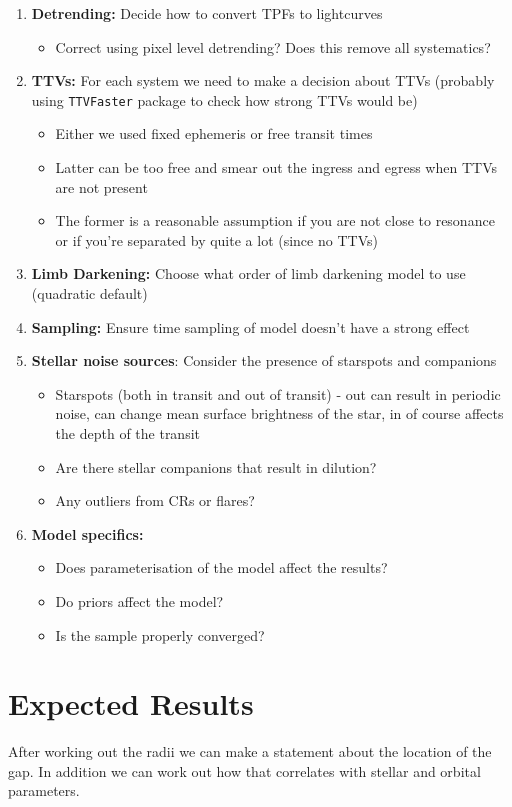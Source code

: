 \documentclass[12pt, letterpaper, twoside]{article}
\begin{document}
\begin{enumerate}
    \item \textbf{Detrending:} Decide how to convert TPFs to lightcurves
    \begin{itemize}
        \item Correct using pixel level detrending? Does this remove all systematics?
    \end{itemize}
    \item \textbf{TTVs:} For each system we need to make a decision about TTVs (probably using \texttt{TTVFaster} package to check how strong TTVs would be)
    \begin{itemize}
        \item Either we used fixed ephemeris or free transit times
        \item Latter can be too free and smear out the ingress and egress when TTVs are not present
        \item The former is a reasonable assumption if you are not close to resonance or if you're separated by quite a lot (since no TTVs)
    \end{itemize}
    \item \textbf{Limb Darkening:} Choose what order of limb darkening model to use (quadratic default)
    \item \textbf{Sampling:} Ensure time sampling of model doesn't have a strong effect
    \item \textbf{Stellar noise sources}: Consider the presence of starspots and companions
    \begin{itemize}
        \item Starspots (both in transit and out of transit) - out can result in periodic noise, can change mean surface brightness of the star, in of course affects the depth of the transit
        \item Are there stellar companions that result in dilution?
        \item Any outliers from CRs or flares?
    \end{itemize}
    \item \textbf{Model specifics:}
    \begin{itemize}
        \item Does parameterisation of the model affect the results?
        \item Do priors affect the model?
        \item Is the sample properly converged?
    \end{itemize}
\end{enumerate}

\section*{Expected Results}

After working out the radii we can make a statement about the location of the gap. In addition we can work out how that correlates with stellar and orbital parameters.
\end{document}
